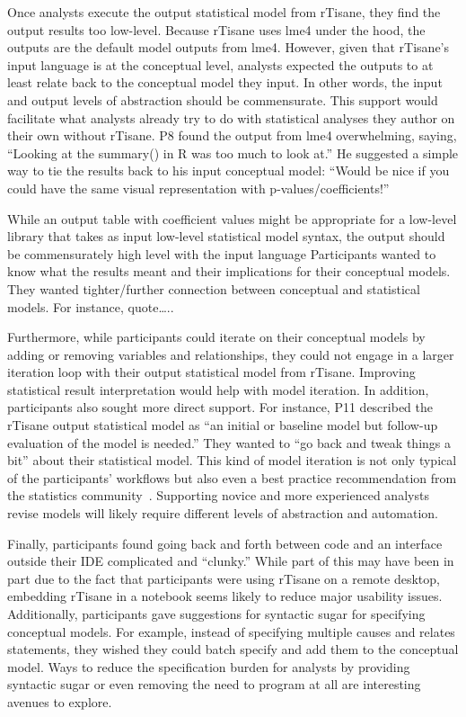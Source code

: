 Once analysts execute the output statistical model from rTisane, they find the
output results too low-level. Because rTisane uses lme4 under the hood, the
outputs are the default model outputs from lme4. However, given that rTisane’s
input language is at the conceptual level, analysts expected the outputs to at
least relate back to the conceptual model they input. In other words, the input
and output levels of abstraction should be commensurate. This support would
facilitate what analysts already try to do with statistical analyses they author
on their own without rTisane. P8 found the output from lme4 overwhelming,
saying, “Looking at the summary() in R was too much to look at.” He suggested a
simple way to tie the results back to his input conceptual model: “Would be nice
if you could have the same visual representation with p-values/coefficients!”

{While an output table with coefficient values might be appropriate for a
low-level library that takes as input low-level statistical model syntax, the
output should be commensurately high level with the input language Participants
wanted to know what the results meant and their implications for their
conceptual models. They wanted tighter/further connection between conceptual and
statistical models. For instance, quote…..}

Furthermore, while participants could iterate on their conceptual models by
adding or removing variables and relationships, they could not engage in a
larger iteration loop with their output statistical model from rTisane.
Improving statistical result interpretation would help with model iteration. In
addition, participants also sought more direct support. For instance, P11
described the rTisane output statistical model as “an initial or baseline model
but follow-up evaluation of the model is needed.” They wanted to “go back and
tweak things a bit” about their statistical model. This kind of model iteration
is not only typical of the participants’ workflows but also even a best practice
recommendation from the statistics community~\cite{bayesian workflow}.
Supporting novice and more experienced analysts revise models will likely
require different levels of abstraction and automation. 

Finally, participants found going back and forth between code and an interface
outside their IDE complicated and ``clunky.'' While part of this may have been
in part due to the fact that participants were using rTisane on a remote
desktop, embedding rTisane in a notebook seems likely to reduce major usability
issues. Additionally, participants gave suggestions for syntactic sugar for
specifying conceptual models. For example, instead of specifying multiple causes
and relates statements, they wished they could batch specify and add them to the
conceptual model. Ways to reduce the specification burden for analysts by
providing syntactic sugar or even removing the need to program at all are
interesting avenues to explore. 
